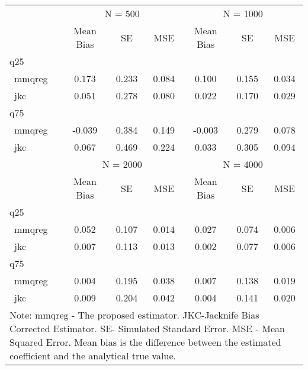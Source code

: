 \begin{tabular}{l*{6}{c}}
\hline
            &     \multicolumn{3}{c}{N = 500}   &     \multicolumn{3}{c}{N = 1000}            \\
            &  Mean Bias &          SE&        MSE&   Mean Bias&          SE&        MSE \\
\hline
q25         &            &            &            &            &            &            \\
\ mmqreg      &       0.173&       0.233&       0.084&       0.100&       0.155&       0.034\\
\ jkc         &       0.051&       0.278&       0.080&       0.022&       0.170&       0.029\\
\hline
q75         &            &            &            &            &            &            \\
\ mmqreg      &      -0.039&       0.384&       0.149&      -0.003&       0.279&       0.078\\
\ jkc         &       0.067&       0.469&       0.224&       0.033&       0.305&       0.094\\
\hline
            &     \multicolumn{3}{c}{N = 2000}   &     \multicolumn{3}{c}{N = 4000}            \\
            &  Mean Bias &          SE&        MSE&   Mean Bias&          SE&        MSE \\
\hline
q25         &            &            &            &            &            &            \\
\ mmqreg      &       0.052&       0.107&       0.014&       0.027&       0.074&       0.006\\
\ jkc         &       0.007&       0.113&       0.013&       0.002&       0.077&       0.006\\
\hline
q75         &            &            &            &            &            &            \\
\ mmqreg      &       0.004&       0.195&       0.038&       0.007&       0.138&       0.019\\
\ jkc         &       0.009&       0.204&       0.042&       0.004&       0.141&       0.020\\
\hline
\multicolumn{7}{p{.7\textwidth}}{ \footnotesize Note: mmqreg - The proposed estimator. 
JKC-Jacknife Bias Corrected Estimator. SE- Simulated Standard Error.
MSE - Mean Squared Error. Mean bias is the difference 
between the estimated coefficient and the analytical true value. }\\
\end{tabular}